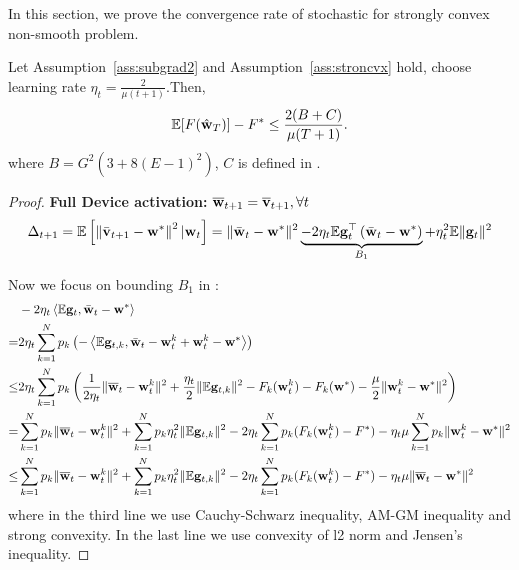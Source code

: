 
In this section, we prove the convergence rate of stochastic for strongly convex
non-smooth problem.


\begin{theorem}
	Let Assumption~\ref{ass:subgrad2} and Assumption~\ref{ass:stroncvx} hold, choose learning rate $\eta_t = \frac{2}{\mu(t+1)} $.Then,
	\begin{align}
		\mathbb{E}[F(\hat{{\mathbf{w}}}_T)] - F^* \leq \frac{2(B + C)}{\mu(T+1)}.
	\end{align}
	where $B =  G^2 (3  + 8 (E-1)^2)$, $C$ is defined in \eq{\ref{eq:partialsample}}.
\end{theorem}


\begin{proof}

\textbf{Full Device activation: }  ${\overline{\mathbf{w}}}_{t+1} = {\overline{\mathbf{v}}}_{t+1}, \forall t$ 
\begin{align}
\Delta_{t+1} = \mathbb{E}\left[\left\|\bar{{\mathbf{v}}}_{t+1}-{\mathbf{w}}^{*}\right\|^2| {\mathbf{w}}_{t}\right]=\|\bar{{\mathbf{w}}}_{t}-{\mathbf{w}}^{*}\|^{2} \underbrace{ - 2 \eta_{t} \mathbb{E} {\mathbf{g}}_{t}^{\top}\left(\bar{{\mathbf{w}}}_{t}-{\mathbf{w}}^{*}\right)}_{B_1} + \eta_{t}^{2} \mathbb{E}\| {\mathbf{g}}_{t} \|^{2}	
\label{eq:expand2}
\end{align}


Now we focus on bounding $B_1$ in \eq{\ref{eq:expand}}: 
\begin{align}
	& -2 \eta_{t} \left<\mathbb{E} {\mathbf{g}}_{t}, \bar{{\mathbf{w}}}_{t}-{\mathbf{w}}^{*} \right>\\
  = & 2 \eta_{t} \sum_{k=1}^N p_k \left(-\left<\mathbb{E} {\mathbf{g}}_{t,k}, \bar{{\mathbf{w}}}_{t}-{\mathbf{w}}_t^k + {\mathbf{w}}_t^k - {\mathbf{w}}^{*} \right> \right) \\
  \leq& 2 \eta_{t} \sum_{k=1}^N p_k  \left(\frac{1}{2\eta_t} \|\overline{{\mathbf{w}}}_t - {\mathbf{w}}_t^k\|^2 + \frac{\eta_t}{2} \|\mathbb{E} {\mathbf{g}}_{t,k}\|^2 - F_k({\mathbf{w}}_t^k) - F_k({\mathbf{w}}^*) - \frac{\mu}{2} \|{\mathbf{w}}_t^k - {\mathbf{w}}^*\|^2 \right) \\
  =& \sum_{k=1}^N p_k \|\overline{{\mathbf{w}}}_t - {\mathbf{w}}_t^k\|^2 +  \sum_{k=1}^N p_k \eta_t^2 \|\mathbb{E} {\mathbf{g}}_{t,k}\|^2 
  - 2\eta_t\sum_{k=1}^N p_k (F_k({\mathbf{w}}_t^k) - F^*) - \eta_t \mu \sum_{k=1}^N p_k \|{\mathbf{w}}_t^k - {\mathbf{w}}^*\|^2 \\
  \leq & \sum_{k=1}^N p_k \|\overline{{\mathbf{w}}}_t - {\mathbf{w}}_t^k\|^2 +  \sum_{k=1}^N p_k \eta_t^2 \|\mathbb{E} {\mathbf{g}}_{t,k}\|^2 
  - 2\eta_t\sum_{k=1}^N p_k (F_k({\mathbf{w}}_t^k) - F^*) - \eta_t \mu \|{\overline{\mathbf{w}}}_t- {\mathbf{w}}^*\|^2  \label{eq:scvxnsmth1}
\end{align}
where in the third line we use Cauchy-Schwarz inequality, AM-GM inequality and strong convexity.
In the last line we use convexity of l2 norm and Jensen's inequality.


\end{proof}
